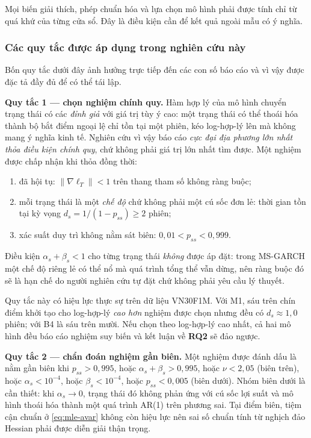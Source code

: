 \documentclass[12pt,a4paper]{article}
\numberwithin{equation}{section}
\newcommand{\RQ}[1]{\textbf{RQ#1}}
\begin{document}
Mọi biến giải thích, phép chuẩn hóa và lựa chọn mô hình phải được tính chỉ từ quá khứ của từng cửa sổ. Đây là điều kiện cần để kết quả ngoài mẫu có ý nghĩa.

\subsubsection*{Các quy tắc được áp dụng trong nghiên cứu này}

Bốn quy tắc dưới đây ảnh hưởng trực tiếp đến các con số báo cáo và vì vậy được đặc tả đầy đủ để có thể tái lập.

\textbf{Quy tắc 1 --- chọn nghiệm chính quy.} Hàm hợp lý của mô hình chuyển trạng thái có các \emph{đỉnh giả} với giá trị tùy ý cao: một trạng thái có thể thoái hóa thành bộ bắt điểm ngoại lệ chỉ tồn tại một phiên, kéo log-hợp-lý lên mà không mang ý nghĩa kinh tế. Nghiên cứu vì vậy báo cáo \emph{cực đại địa phương lớn nhất thỏa điều kiện chính quy}, chứ không phải giá trị lớn nhất tìm được. Một nghiệm được chấp nhận khi thỏa đồng thời:

\begin{enumerate}
  \item[(C1)] đã hội tụ: $\lVert\nabla\ell_T\rVert < 1$ trên thang tham số không ràng buộc;
  \item[(C2)] mỗi trạng thái là một \emph{chế độ} chứ không phải một cú sốc đơn lẻ: thời gian tồn tại kỳ vọng $d_s = 1/(1-p_{ss}) \ge 2$ phiên;
  \item[(C3)] xác suất duy trì không nằm sát biên: $0{,}01 < p_{ss} < 0{,}999$.
\end{enumerate}

Điều kiện $\alpha_s+\beta_s<1$ cho từng trạng thái \emph{không} được áp đặt: trong MS-GARCH một chế độ riêng lẻ có thể nổ mà quá trình tổng thể vẫn dừng, nên ràng buộc đó sẽ là hạn chế do người nghiên cứu tự đặt chứ không phải yêu cầu lý thuyết.

Quy tắc này có hiệu lực thực sự trên dữ liệu VN30F1M. Với M1, sáu trên chín điểm khởi tạo cho log-hợp-lý \emph{cao hơn} nghiệm được chọn nhưng đều có $d_s\approx1{,}0$ phiên; với B4 là sáu trên mười. Nếu chọn theo log-hợp-lý cao nhất, cả hai mô hình đều báo cáo nghiệm suy biến và kết luận về \RQ{2} sẽ đảo ngược.

\textbf{Quy tắc 2 --- chẩn đoán nghiệm gần biên.} Một nghiệm được đánh dấu là nằm gần biên khi $p_{ss}>0{,}995$, hoặc $\alpha_s+\beta_s>0{,}995$, hoặc $\nu<2{,}05$ (biên trên), hoặc $\alpha_s<10^{-4}$, hoặc $\beta_s<10^{-4}$, hoặc $p_{ss}<0{,}005$ (biên dưới). Nhóm biên dưới là cần thiết: khi $\alpha_s\to0$, trạng thái đó không phản ứng với cú sốc lợi suất và mô hình thoái hóa thành một quá trình AR(1) trên phương sai. Tại điểm biên, tiệm cận chuẩn ở \cref{eq:mle-avar} không còn hiệu lực nên sai số chuẩn tính từ nghịch đảo Hessian phải được diễn giải thận trọng.
\end{document}
